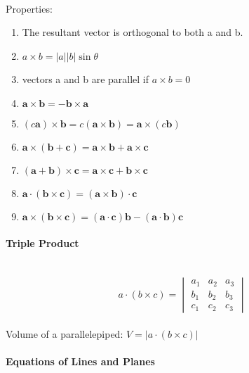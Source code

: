 \documentclass{article}
\begin{document}
\\\\\\
Properties:
\begin{enumerate}
    \item The resultant vector is orthogonal to both a and b.
    \item \(a \times b = |a||b|\sin{\theta}\)
    \item vectors a and b are parallel if \(a \times b = 0\)
    \item \( \mathbf{a} \times \mathbf{b} = -\mathbf{b} \times \mathbf{a} \)
    \item \( (c\mathbf{a}) \times \mathbf{b} = c(\mathbf{a} \times \mathbf{b}) = \mathbf{a} \times (c\mathbf{b}) \)
    \item \( \mathbf{a} \times (\mathbf{b} + \mathbf{c}) = \mathbf{a} \times \mathbf{b} + \mathbf{a} \times \mathbf{c} \)
    \item \( (\mathbf{a} + \mathbf{b}) \times \mathbf{c} = \mathbf{a} \times \mathbf{c} + \mathbf{b} \times \mathbf{c} \)
    \item \( \mathbf{a} \cdot (\mathbf{b} \times \mathbf{c}) = (\mathbf{a} \times \mathbf{b}) \cdot \mathbf{c} \)
    \item \( \mathbf{a} \times (\mathbf{b} \times \mathbf{c}) = (\mathbf{a} \cdot \mathbf{c})\mathbf{b} - (\mathbf{a} \cdot \mathbf{b})\mathbf{c} \)
\end{enumerate}

\paragraph{Triple Product}\mbox{}\\
\begin{equation}
    \label{triple product}
    a \cdot (b \times c) = 
    \begin{vmatrix}
        a_1 & a_2 & a_3\\
        b_1 & b_2 & b_3\\
        c_1 & c_2 & c_3
    \end{vmatrix}
\end{equation}\\
Volume of a parallelepiped: \(V = |a \cdot (b \times c)|\)\\

\paragraph{Equations of Lines and Planes}\mbox{}\\
\end{document}
